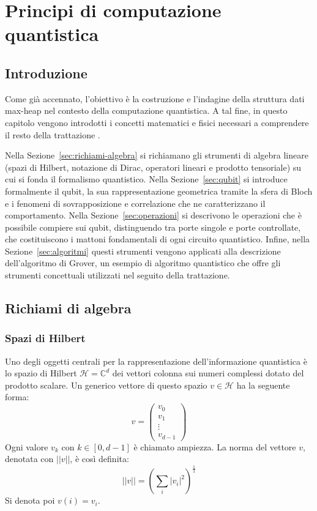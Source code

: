 \chapter{Principi di computazione quantistica \label{ch:quantum}}
\section{Introduzione}
Come già accennato, l'obiettivo è la costruzione e l'indagine della struttura dati max-heap nel contesto della computazione quantistica. A tal fine, in questo capitolo vengono introdotti i concetti matematici e fisici necessari a comprendere il resto della trattazione \cite{Nielsen_Chuang_2010}.

Nella Sezione~\ref{sec:richiami-algebra} si richiamano gli strumenti di algebra lineare (spazi di Hilbert, notazione di Dirac, operatori lineari e prodotto tensoriale) su cui si fonda il formalismo quantistico. Nella Sezione~\ref{sec:qubit} si introduce formalmente il qubit, la sua rappresentazione geometrica tramite la sfera di Bloch e i fenomeni di sovrapposizione e correlazione che ne caratterizzano il comportamento. Nella Sezione~\ref{sec:operazioni} si descrivono le operazioni che è possibile compiere sui qubit, distinguendo tra porte singole e porte controllate, che costituiscono i mattoni fondamentali di ogni circuito quantistico. Infine, nella Sezione~\ref{sec:algoritmi} questi strumenti vengono applicati alla descrizione dell'algoritmo di Grover, un esempio di algoritmo quantistico che offre gli strumenti concettuali utilizzati nel seguito della trattazione.

\section{Richiami di algebra \label{sec:richiami-algebra}}
\subsection{Spazi di Hilbert}
Uno degli oggetti centrali per la rappresentazione dell'informazione quantistica è lo spazio di Hilbert $\mathcal{H} = \mathbb{C}^d$ dei vettori colonna sui numeri complessi dotato del prodotto scalare. Un generico vettore di questo spazio $v \in \mathcal{H}$ ha la seguente forma:
\begin{equation}
  v =
  \begin{pmatrix}
    v_0    \\
    v_1    \\
    \vdots \\
    v_{d - 1}
  \end{pmatrix}
\end{equation}
Ogni valore $v_k$ con $k \in [0, d - 1]$ è chiamato ampiezza. La norma del vettore $v$, denotata con $||v||$, è così definita:
\begin{equation}
  ||v|| = \left(\sum_i |v_i|^2\right)^{\frac{1}{2}}
\end{equation}
Si denota poi $v(i) = v_i$.
